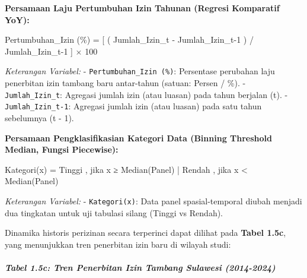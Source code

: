 \documentclass[
]{article}
\newenvironment{Shaded}{}{}
\newcommand{\NormalTok}[1]{#1}
\begin{document}
\textbf{Persamaan Laju Pertumbuhan Izin Tahunan (Regresi Komparatif
YoY):}

\begin{Shaded}
\begin{Highlighting}[]
\NormalTok{Pertumbuhan\_Izin (\%) = [ ( Jumlah\_Izin\_t {-} Jumlah\_Izin\_t{-}1 ) / Jumlah\_Izin\_t{-}1 ] × 100}
\end{Highlighting}
\end{Shaded}

\emph{Keterangan Variabel:} - \texttt{Pertumbuhan\_Izin\ (\%)}:
Persentase perubahan laju penerbitan izin tambang baru antar-tahun
(satuan: Persen / \%). - \texttt{Jumlah\_Izin\_t}: Agregasi jumlah izin
(atau luasan) pada tahun berjalan (t). - \texttt{Jumlah\_Izin\_t-1}:
Agregasi jumlah izin (atau luasan) pada satu tahun sebelumnya (t - 1).

\textbf{Persamaan Pengklasifikasian Kategori Data (Binning Threshold
Median, Fungsi Piecewise):}

\begin{Shaded}
\begin{Highlighting}[]
\NormalTok{Kategori(x) = \textquotesingle{}Tinggi\textquotesingle{} , jika x ≥ Median(Panel)   |   \textquotesingle{}Rendah\textquotesingle{} , jika x \textless{} Median(Panel)}
\end{Highlighting}
\end{Shaded}

\emph{Keterangan Variabel:} - \texttt{Kategori(x)}: Data panel
spasial-temporal diubah menjadi dua tingkatan untuk uji tabulasi silang
(Tinggi vs Rendah).

Dinamika historis perizinan secara terperinci dapat dilihat pada
\textbf{Tabel 1.5c}, yang menunjukkan tren penerbitan izin baru di
wilayah studi:

\subparagraph{Tabel 1.5c: Tren Penerbitan Izin Tambang Sulawesi
(2014-2024)}\label{tabel-1.5c-tren-penerbitan-izin-tambang-sulawesi-2014-2024}
\end{document}
